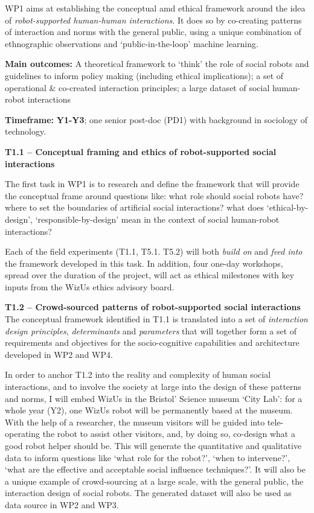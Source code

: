 \documentclass[11pt,a4paper]{report}
\newcommand{\project}{WizUs\xspace}
\begin{document}
WP1 aims at establishing the conceptual amd ethical framework around the idea of
\emph{robot-supported human-human interactions}. It does so by co-creating
patterns of interaction and norms with the general public, using a unique
combination of ethnographic observations and `public-in-the-loop' machine
learning.

\begin{framed}
    \textbf{Main outcomes:} A theoretical framework to `think' the role of
    social robots and guidelines to inform policy making (including ethical
    implications); a set of operational \& co-created interaction principles; a
    large dataset of social human-robot interactions

    \textbf{Timeframe:} \textbf{Y1-Y3}; one senior post-doc (PD1)
with background in sociology of technology.
\end{framed}


\textbf{T1.1 -- Conceptual framing and ethics of robot-supported social
interactions}


The first task in WP1 is to research and define the framework that will provide
the conceptual frame around questions like: what role should social robots have? where
to set the boundaries of artificial social interactions?  what does
`ethical-by-design', `responsible-by-design' mean in the context of social
human-robot interactions? 

Each of the field experiments (T1.1, T5.1. T5.2) will both \emph{build on} and
\emph{feed into} the framework developed in this task. In addition, four
one-day workshops, spread over the
duration of the project, will act as ethical milestones with key inputs from the
\project ethics advisory board.

\textbf{T1.2 -- Crowd-sourced patterns of robot-supported social
interactions} The conceptual framework identified in T1.1 is translated
into a set of \emph{interaction design principles}, \emph{determinants} and
\emph{parameters} that will together form a set of requirements and objectives
for the socio-cognitive capabilities and architecture developed in WP2 and WP4.

In order to anchor T1.2 into the reality and complexity of human social
interactions, and to involve the society at large into the design of these
patterns and norms, I will embed \project in the Bristol' Science museum `City
Lab': for a whole year (Y2), one \project robot will be permanently based at the
museum. With the help of a researcher, the museum visitors will be guided into
tele-operating the robot to assist other visitors, and, by doing so, co-design
what a good robot helper should be. This will generate the quantitative and
qualitative data to inform questions like `what role for the robot?', `when to
intervene?', `what are the effective and acceptable social influence
techniques?'. It will also be a unique example of crowd-sourcing at a large
scale, with the general public, the interaction design of social robots.  The
generated dataset will also be used as data source in WP2 and WP3.
\end{document}
